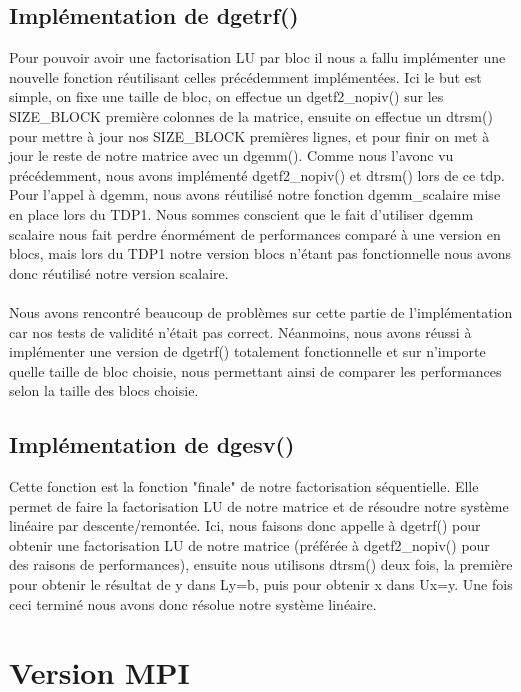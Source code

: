 \documentclass{article}
\begin{document}
\subsection{Implémentation de dgetrf()}Pour pouvoir avoir une factorisation LU par bloc il nous a fallu implémenter une nouvelle fonction réutilisant celles précédemment implémentées. Ici le but est simple, on fixe une taille de bloc, on effectue un dgetf2\_nopiv() sur les SIZE\_BLOCK première colonnes de la matrice, ensuite on effectue un dtrsm() pour mettre à jour nos SIZE\_BLOCK premières lignes, et pour finir on met à jour le reste de notre matrice avec un dgemm(). Comme nous l'avonc vu précédemment, nous avons implémenté dgetf2\_nopiv() et dtrsm() lors de ce tdp. Pour l'appel à dgemm, nous avons réutilisé notre fonction dgemm\_scalaire mise en place lors du TDP1. Nous sommes conscient que le fait d'utiliser dgemm scalaire nous fait perdre
énormément de performances comparé à une version en blocs, mais lors du TDP1 notre version blocs n'étant pas fonctionnelle nous avons donc réutilisé notre version scalaire.

\paragraph{}Nous avons rencontré beaucoup de problèmes sur cette partie de l'implémentation car nos tests de validité n'était pas correct. Néanmoins, nous avons réussi à implémenter une version de dgetrf() totalement fonctionnelle et sur n'importe quelle taille de bloc choisie, nous permettant ainsi de comparer les performances selon la taille des blocs choisie.

\subsection{Implémentation de dgesv()}Cette fonction est la fonction "finale" de notre factorisation séquentielle. Elle permet de faire la factorisation LU de notre matrice et de résoudre notre système linéaire par descente/remontée. Ici, nous faisons donc appelle à dgetrf() pour obtenir une factorisation LU de notre matrice (préférée à dgetf2\_nopiv() pour des raisons de performances), ensuite nous utilisons dtrsm() deux fois, la première pour obtenir le résultat de y dans Ly=b, puis pour obtenir x dans Ux=y. Une fois ceci terminé nous avons donc résolue notre système linéaire.

\section{Version MPI}
\end{document}
